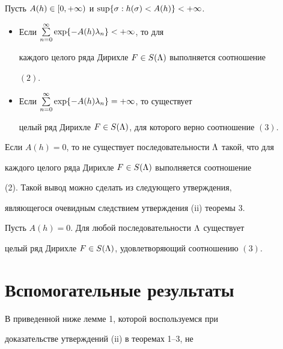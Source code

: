 \begin{thm}


Пусть $A(h)\in [0,+\infty)$ и $\sup\{\sigma:h(\sigma)<A(h)\}<+\infty$. 


\begin{itemize}


\item[(i)] Если $\sum\limits_{n=0}^\infty\exp\{-A(h)\lambda_n\}<+\infty$, то для


каждого целого ряда Дирихле $F\in S(\Lambda)$ выполняется соотношение


$(2)$. 


\item[(ii)] Если $\sum\limits_{n=0}^\infty\exp\{-A(h)\lambda_n\}=+\infty$, то существует


целый ряд Дирихле $F\in S(\Lambda)$, для которого верно соотношение $(3)$.


\end{itemize}


\end{thm}





Если $A(h)=0$, то не существует последовательности $\Lambda$ такой, что для


каждого целого ряда Дирихле $F\in S(\Lambda)$ выполняется соотношение


(2). Такой вывод можно сделать из следующего утверждения,


являющегося очевидным следствием утверждения (ii) теоремы 3. 





\begin{thm}


Пусть $A(h)=0$. Для любой последовательности $\Lambda$ существует


целый ряд Дирихле $F\in S(\Lambda)$, удовлетворяющий соотношению $(3)$.


\end{thm}








\section{Вспомогательные результаты}





В приведенной ниже лемме 1, которой воспользуемся при


доказательстве утверждений (ii) в теоремах 1--3, не


